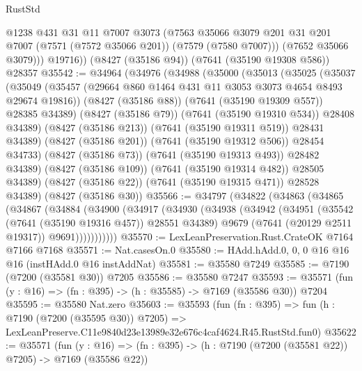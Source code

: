 \begin{lexlean}{RustStd}
\begin{coremodule}
            @1238
            @431
            @31
            @11
            @7007
            @3073
            (@7563
              @35066
              @3079
              @201
              @31
              @201
              @7007
              (@7571 (@7572 @35066 @201))
              (@7579 (@7580 @7007)))
            (@7652 @35066 @3079)))
        @19716))
    (@8427 (@35186 @94))
    (@7641 (@35190 @19308 @586))
    @28357
@35542 := @34964
    (@34976
      (@34988
        (@35000
          (@35013
            (@35025
              (@35037
                (@35049
                  (@35457 (@29664 @860 @1464 @431 @11 @3053 @3073 @4654 @8493 @29674 @19816))
                  (@8427 (@35186 @88))
                  (@7641 (@35190 @19309 @557))
                  @28385
                  @34389)
                (@8427 (@35186 @79))
                (@7641 (@35190 @19310 @534))
                @28408
                @34389)
              (@8427 (@35186 @213))
              (@7641 (@35190 @19311 @519))
              @28431
              @34389)
            (@8427 (@35186 @201))
            (@7641 (@35190 @19312 @506))
            @28454
            @34733)
          (@8427 (@35186 @73))
          (@7641 (@35190 @19313 @493))
          @28482
          @34389)
        (@8427 (@35186 @109))
        (@7641 (@35190 @19314 @482))
        @28505
        @34389)
      (@8427 (@35186 @22))
      (@7641 (@35190 @19315 @471))
      @28528
      @34389)
    (@8427 (@35186 @30))
@35566 := @34797
    (@34822
      (@34863
        (@34865
          (@34867
            (@34884
              (@34900
                (@34917
                  (@34930
                    (@34938
                      (@34942
                        (@34951
                          (@35542 (@7641 (@35190 @19316 @457)) @28551 @34389)
                          @9679
                          (@7641 (@20129 @2511 @19317))
                          @9691)))))))))))
@35570 := LexLeanPreservation.Rust.CrateOK @7164 @7166 @7168
@35571 := Nat.casesOn.{0}
@35580 := HAdd.hAdd.{0, 0, 0} @16 @16 @16 (instHAdd.{0} @16 instAddNat)
@35581 := @35580 @7249
@35585 := @7190 (@7200 (@35581 @30)) @7205
@35586 := @35580 @7247
@35593 := @35571 (fun (y : @16) => (fn : @395) -> (h : @35585) -> @7169 (@35586 @30)) @7204
@35595 := @35580 Nat.zero
@35603 := @35593
    (fun (fn : @395) =>
    fun (h : @7190 (@7200 (@35595 @30)) @7205) =>
    LexLeanPreserve.C11e9840d23e13989e32e676c4caf4624.R45.RustStd.fun0)
@35622 := @35571
    (fun (y : @16) => (fn : @395) -> (h : @7190 (@7200 (@35581 @22)) @7205) -> @7169 (@35586 @22))

\end{coremodule}
\end{lexlean}
